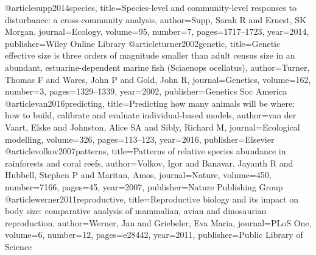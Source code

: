 @article{supp2014species,
	title={Species-level and community-level responses to disturbance: a cross-community analysis},
	author={Supp, Sarah R and Ernest, SK Morgan},
	journal={Ecology},
	volume={95},
	number={7},
	pages={1717--1723},
	year={2014},
	publisher={Wiley Online Library}
}
@article{turner2002genetic,
	title={Genetic effective size is three orders of magnitude smaller than adult census size in an abundant, estuarine-dependent marine fish (Sciaenops ocellatus)},
	author={Turner, Thomas F and Wares, John P and Gold, John R},
	journal={Genetics},
	volume={162},
	number={3},
	pages={1329--1339},
	year={2002},
	publisher={Genetics Soc America}
}
@article{van2016predicting,
	title={Predicting how many animals will be where: how to build, calibrate and evaluate individual-based models},
	author={van der Vaart, Elske and Johnston, Alice SA and Sibly, Richard M},
	journal={Ecological modelling},
	volume={326},
	pages={113--123},
	year={2016},
	publisher={Elsevier}
}
@article{volkov2007patterns,
	title={Patterns of relative species abundance in rainforests and coral reefs},
	author={Volkov, Igor and Banavar, Jayanth R and Hubbell, Stephen P and Maritan, Amos},
	journal={Nature},
	volume={450},
	number={7166},
	pages={45},
	year={2007},
	publisher={Nature Publishing Group}
}
@article{werner2011reproductive,
	title={Reproductive biology and its impact on body size: comparative analysis of mammalian, avian and dinosaurian reproduction},
	author={Werner, Jan and Griebeler, Eva Maria},
	journal={PLoS One},
	volume={6},
	number={12},
	pages={e28442},
	year={2011},
	publisher={Public Library of Science}
}


